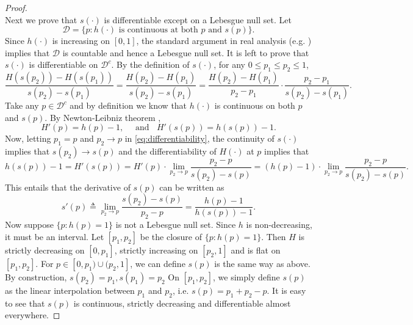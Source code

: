 \documentclass{biometrika}
\newcommand{\1}{\mathbf{1}}
\begin{document}
\begin{proof}
~\\
Next we prove that $s(\cdot)$ is differentiable except on a Lebesgue null set. Let 
\[\mathcal{D} = \{p: h(\cdot)\mbox{ is continuous at both }p\mbox{ and }s(p)\}.\]
Since $h(\cdot)$ is increasing on $[0, 1]$, the standard argument in real analysis (e.g. \cite{rudin}) implies that $\mathcal{D}$ is countable and hence a Lebesgue null set. It is left to prove that $s(\cdot)$ is differentiable on $\mathcal{D}^{c}$. By the definition of $s(\cdot)$, for any $0\le p_{1}\le p_{2}\le 1$,
\begin{equation}\label{eq:differentiability}
\frac{H(s(p_{2})) - H(s(p_{1}))}{s(p_{2}) - s(p_{1})} = \frac{H(p_{2}) - H(p_{1})}{s(p_{2}) - s(p_{1})} = \frac{H(p_{2}) - H(p_{1})}{p_{2} - p_{1}}\cdot \frac{p_{2} - p_{1}}{s(p_{2}) - s(p_{1})}.
\end{equation}
Take any $p\in \mathcal{D}^{c}$ and by definition we know that $h(\cdot)$ is continuous on both $p$ and $s(p)$. By Newton-Leibniz theorem \citep{rudin}, 
\[H'(p) = h(p) - 1, \quad \text{ and ~}~ H'(s(p)) = h(s(p)) - 1.\]
Now, letting $p_{1} = p$ and $p_{2}\rightarrow p$ in \eqref{eq:differentiability}, the continuity of $s(\cdot)$ implies that $s(p_{2})\rightarrow s(p)$ and the differentiability of $H(\cdot)$ at $p$ implies that 
\[h(s(p)) - 1 = H'(s(p)) = H'(p)\cdot \lim_{p_{2}\rightarrow p}\frac{p_{2} - p}{s(p_{2}) - s(p)} = (h(p) - 1)\cdot \lim_{p_{2}\rightarrow p}\frac{p_{2} - p}{s(p_{2}) - s(p)}.\]
This entails that the derivative of $s(p)$ can be written as
\begin{equation}\label{eq:sderiv}
s'(p)\triangleq \lim_{p_{2}\rightarrow p}\frac{s(p_{2}) - s(p)}{p_{2} - p} = \frac{h(p) - 1}{h(s(p)) - 1}.
\end{equation}
Now suppose $\{p: h(p) = 1\}$ is not a Lebesgue null set. Since $h$ is non-decreasing, it must be an interval. Let $[p_{1}, p_{2}]$ be the closure of $\{p: h(p) = 1\}$. Then $H$ is strictly decreasing on $[0, p_{1}]$, strictly increasing on $[p_{2}, 1]$ and is flat on $[p_{1}, p_{2}]$. For $p\in [0, p_{1})\cup (p_{2}, 1]$, we can define $s(p)$ is the same way as above. By construction, $s(p_{2}) = p_{1}, s(p_{1}) = p_{2}$ On $[p_{1}, p_{2}]$, we simply define $s(p)$ as the linear interpolation between $p_{1}$ and $p_{2}$, i.e. $s(p) = p_{1} + p_{2} - p$. It is easy to see that $s(p)$ is continuous, strictly decreasing and differentiable almost everywhere. 


\end{proof}
\end{document}

